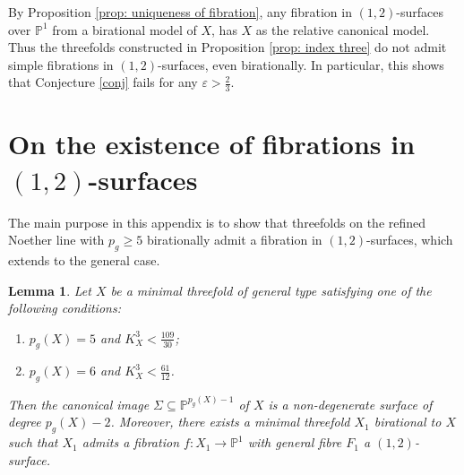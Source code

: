 \documentclass[a4paper,11pt]{amsart}
\newcommand{\PP}{\ensuremath{\mathbb{P}}}
\newtheorem{lem}[thm]{Lemma}
\theoremstyle{definition}
\theoremstyle{remark}
\numberwithin{equation}{section}
\begin{document}
By Proposition \ref{prop: uniqueness of fibration}, any fibration in $(1, 2)$-surfaces over $\PP^1$ from a birational model of $X$, has $X$ as the relative canonical model. Thus the threefolds constructed in Proposition \ref{prop: index three} do not admit simple fibrations in $(1,2)$-surfaces, even birationally. In particular, this shows that Conjecture \ref{conj} fails for any $\varepsilon > \frac{2}{3}$.

\appendix

\section{On the existence of fibrations in \texorpdfstring{$(1, 2)$}{(1,2)}-surfaces} \label{section: A1}

The main purpose in this appendix is to show that threefolds on the refined Noether line with $p_g \ge 5$ birationally admit a fibration in $(1, 2)$-surfaces, which extends \cite[Proposition 2.1 and 4.6]{HZ} to the general case.

\begin{lem} \label{lem: p_g5}
   Let $X$ be a minimal threefold of general type satisfying one of the following conditions:
   \begin{enumerate}
       \item $p_g(X)=5$ and $K_X^3 < \frac{109}{30}$;
       \item $p_g(X)=6$ and $K_X^3 < \frac{61}{12}$.
   \end{enumerate}
   Then the canonical image $\Sigma\subseteq\PP^{p_g(X)-1}$ of $X$ is a non-degenerate surface of degree $p_g(X)-2$.  Moreover, there exists a minimal threefold $X_1$ birational to $X$ such that $X_1$ admits a fibration $f: X_1 \to \PP^1$ with general fibre $F_1$ a $(1,2)$-surface. 
\end{lem}
\end{document}
